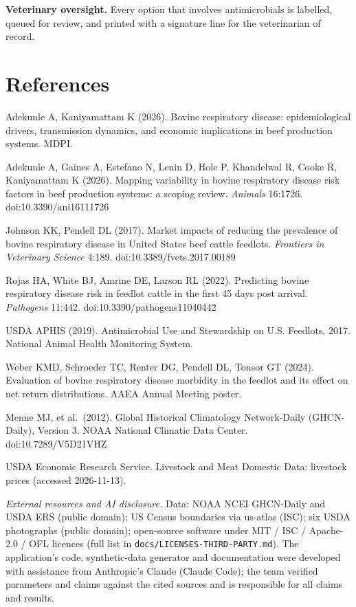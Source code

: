 \documentclass[10pt,letterpaper]{article}
\newcommand{\lead}[1]{\textbf{#1}\enspace}
\begin{document}
\lead{Veterinary oversight.} Every option that involves antimicrobials is labelled, queued for review, and printed with a signature line for the veterinarian of record.

\section*{References}
\small
\begin{enumerate}[label={[\arabic*]},leftmargin=2em,itemsep=1pt]
  \item Adekunle A, Kaniyamattam K (2026). Bovine respiratory disease: epidemiological drivers, transmission dynamics, and economic implications in beef production systems. MDPI.
  \item Adekunle A, Gaines A, Estefano N, Lenin D, Hole P, Khandelwal R, Cooke R, Kaniyamattam K (2026). Mapping variability in bovine respiratory disease risk factors in beef production systems: a scoping review. \emph{Animals} 16:1726. doi:10.3390/ani16111726
  \item Johnson KK, Pendell DL (2017). Market impacts of reducing the prevalence of bovine respiratory disease in United States beef cattle feedlots. \emph{Frontiers in Veterinary Science} 4:189. doi:10.3389/fvets.2017.00189
  \item Rojas HA, White BJ, Amrine DE, Larson RL (2022). Predicting bovine respiratory disease risk in feedlot cattle in the first 45 days post arrival. \emph{Pathogens} 11:442. doi:10.3390/pathogens11040442
  \item USDA APHIS (2019). Antimicrobial Use and Stewardship on U.S. Feedlots, 2017. National Animal Health Monitoring System.
  \item Weber KMD, Schroeder TC, Renter DG, Pendell DL, Tonsor GT (2024). Evaluation of bovine respiratory disease morbidity in the feedlot and its effect on net return distributions. AAEA Annual Meeting poster.
  \item Menne MJ, et al.\ (2012). Global Historical Climatology Network-Daily (GHCN-Daily), Version 3. NOAA National Climatic Data Center. doi:10.7289/V5D21VHZ
  \item USDA Economic Research Service. Livestock and Meat Domestic Data: livestock prices (accessed 2026-11-13).
\end{enumerate}

\medskip
\emph{External resources and AI disclosure.} Data: NOAA NCEI GHCN-Daily and USDA ERS (public domain); US Census boundaries via us-atlas (ISC); six USDA photographs (public domain); open-source software under MIT / ISC / Apache-2.0 / OFL licences (full list in \texttt{docs/LICENSES-THIRD-PARTY.md}). The application's code, synthetic-data generator and documentation were developed with assistance from Anthropic's Claude (Claude Code); the team verified parameters and claims against the cited sources and is responsible for all claims and results.
\end{document}
